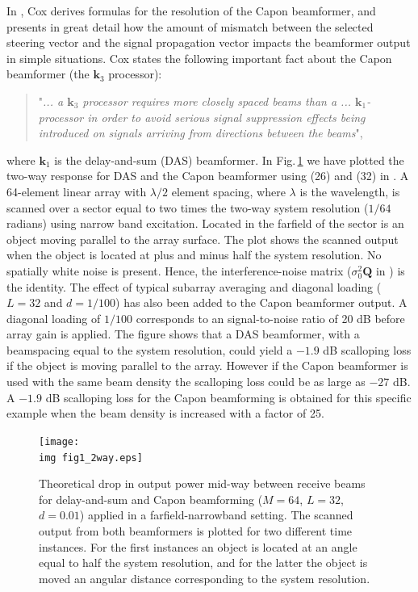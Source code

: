 \documentclass[journal]{IEEEtran}
\newcommand{\mat}[1]{\mathbf{#1}}
\renewcommand{\vec}[1]{\mathbf{#1}}
\newcommand{\img}{img/}
\begin{document}
In \cite{Cox1973}, Cox derives formulas for the resolution of the Capon beamformer, and presents in great detail how the amount of mismatch between the selected steering vector and the signal propagation vector impacts the beamformer output in simple situations. Cox states the following important fact about the Capon beamformer (the $\vec{k}_3$ processor): 
\begin{quote}
"\textit{... a $\vec{k}_3$ processor requires more closely spaced beams than a ... $\vec{k}_1$-processor in order to avoid serious signal suppression effects being introduced on signals arriving from directions between the beams}", 
\end{quote}
where $\vec{k}_1$ is the delay-and-sum (DAS) beamformer. In Fig.\,\ref{fig:das_capon_beams} we have plotted the two-way response for DAS and the Capon beamformer using (26) and (32) in \cite{Cox1973}. A 64-element linear array with $\lambda/2$ element spacing, where $\lambda$ is the wavelength, is scanned over a sector equal to two times the two-way system resolution ($1/64$ radians) using narrow band excitation. Located in the farfield of the sector is an object moving parallel to the array surface. The plot shows the scanned output when the object is located at plus and minus half the system resolution. No spatially white noise is present. Hence, the interference-noise matrix ($\sigma_0^2\mat{Q}$ in \cite{Cox1973}) is the identity. The effect of typical subarray averaging and diagonal loading ($L=32$ and $d=1/100$) has also been added to the Capon beamformer output. A diagonal loading of $1/100$ corresponds to an signal-to-noise ratio of 20 dB before array gain is applied. The figure shows that a DAS beamformer, with a beamspacing equal to the system resolution, could yield a $-1.9$ dB scalloping loss \cite{Harris1978} if the object is moving parallel to the array. However if the Capon beamformer is used with the same beam density the scalloping loss could be as large as $-27$ dB. A $-1.9$ dB scalloping loss for the Capon beamforming is obtained for this specific example when the beam density is increased with a factor of 25. 

\begin{figure}[!t]
\centerline{
\texttt{[image: \\img fig1\_2way.eps]}
}
\caption{Theoretical drop in output power mid-way between receive beams for delay-and-sum and Capon beamforming ($M=64$, $L=32$, $d=0.01$) applied in a farfield-narrowband setting. The scanned output from both beamformers is plotted for two different time instances. For the first instances an object is located at an angle equal to half the system resolution, and for the latter the object is moved an angular distance corresponding to the system resolution.}
\label{fig:das_capon_beams}
\end{figure}
\end{document}
